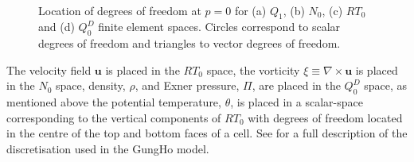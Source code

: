 \documentclass[times]{elsarticle}
\begin{document}
\begin{figure}
\centering
{}%
\\
%
%
\caption{\label{fig:fem-spaces} Location of degrees of freedom at $p=0$ for 
(a) $Q_{1}$, (b) $N_0$, (c) $RT_0$ and (d) $Q_0^D$ finite element spaces.
Circles correspond to scalar degrees of freedom and triangles to vector degrees
of freedom.}
\end{figure}
%
The velocity field $\mathbf{u}$ is placed in the $RT_0$ space, the vorticity 
$\xi\equiv\nabla\times\mathbf{u}$ is placed in the $N_0$ space, density, $\rho$, 
and Exner pressure, $\Pi$, are placed in the $Q_0^D$ space, as mentioned above 
the potential temperature, $\theta$, is placed in a scalar-space corresponding 
to the vertical components of $RT_0$ with degrees of freedom located in the
centre of the top and bottom faces of a cell. See \citet{melvin2018} for a full
description of the discretisation used in the GungHo model.
\end{document}
